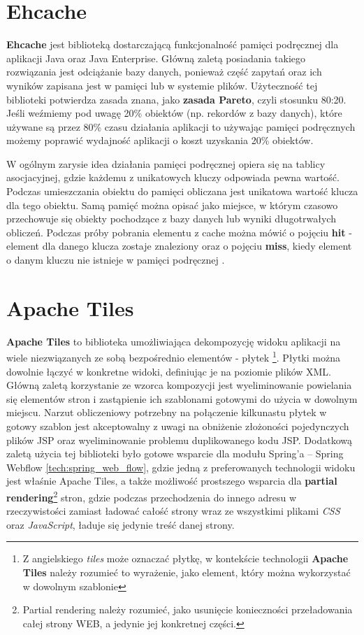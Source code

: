 \section{Ehcache}
	\textbf{Ehcache} jest biblioteką dostarczającą funkcjonalność pamięci podręcznej dla aplikacji Java oraz Java Enterprise. Główną zaletą posiadania takiego rozwiązania jest odciążanie bazy danych, ponieważ część zapytań oraz ich wyników zapisana jest w pamięci lub w systemie plików. Użyteczność tej biblioteki potwierdza zasada znana, jako \textbf{zasada Pareto}, czyli stosunku 80:20. Jeśli weźmiemy pod uwagę 20\% obiektów (np. rekordów z bazy danych), które używane są przez 80\% czasu działania aplikacji to używając pamięci podręcznych możemy poprawić wydajność aplikacji o koszt uzyskania 20\% obiektów.
	
	W ogólnym zarysie idea działania pamięci podręcznej opiera się na tablicy asocjacyjnej, gdzie każdemu z unikatowych kluczy odpowiada pewna wartość. Podczas umieszczania obiektu do pamięci obliczana jest unikatowa wartość klucza dla tego obiektu. Samą pamięć można opisać jako miejsce, w którym czasowo przechowuje się obiekty pochodzące z bazy danych lub wyniki długotrwałych obliczeń. Podczas próby pobrania elementu z cache można mówić o pojęciu \textbf{hit} - element dla danego klucza zostaje znaleziony oraz o pojęciu \textbf{miss}, kiedy element o danym kluczu nie istnieje w pamięci podręcznej \cite{ehcache_documentation_ref}.
		
\section{Apache Tiles}\label{tech:tiles}
	\textbf{Apache Tiles} to biblioteka umożliwiająca dekompozycję widoku aplikacji na wiele niezwiązanych ze sobą bezpośrednio elementów - płytek \footnote{Z angielskiego \textit{tiles} może oznaczać płytkę, w kontekście technologii \textbf{Apache Tiles} należy rozumieć to wyrażenie, jako element, który można wykorzystać w dowolnym szablonie}. Płytki można dowolnie łączyć w konkretne widoki, definiując je na poziomie plików XML. Główną zaletą korzystanie ze wzorca kompozycji jest wyeliminowanie powielania się elementów stron i zastąpienie ich szablonami gotowymi do użycia w dowolnym miejscu. Narzut obliczeniowy potrzebny na połączenie kilkunastu płytek w gotowy szablon jest akceptowalny z uwagi na obniżenie złożoności pojedynczych plików JSP oraz wyeliminowanie problemu duplikowanego kodu JSP. 
	Dodatkową zaletą użycia tej biblioteki było gotowe wsparcie dla modułu Spring’a – Spring Webflow \ref{tech:spring_web_flow}, gdzie jedną z preferowanych technologii widoku jest właśnie Apache Tiles, a także możliwość prostszego wsparcia dla \textbf{partial rendering}\footnote{Partial rendering należy rozumieć, jako usunięcie konieczności przeładowania całej strony WEB, a jedynie jej konkretnej części.} stron, gdzie podczas przechodzenia do innego adresu w rzeczywistości zamiast ładować całość strony wraz ze wszystkimi plikami \textit{CSS} oraz \textit{JavaScript}, ładuje się jedynie treść danej strony. 
	
